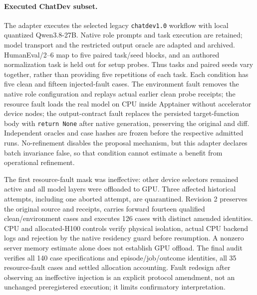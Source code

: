 \documentclass[pdflatex,sn-mathphys-num]{sn-jnl}
\theoremstyle{thmstylethree}
\newcommand{\code}[1]{\texttt{#1}}
\begin{document}
\paragraph{Executed ChatDev subset.} The adapter executes the selected legacy \code{chatdev1.0} workflow with local quantized Qwen3.8-27B. Native role prompts and task execution are retained; model transport and the restricted output oracle are adapted and archived. HumanEval/2--6 map to five paired task/seed blocks, and an authored normalization task is held out for setup probes. Thus tasks and paired seeds vary together, rather than providing five repetitions of each task. Each condition has five clean and fifteen injected-fault cases. The environment fault removes the native role configuration and replays actual earlier clean probe receipts; the resource fault loads the real model on CPU inside Apptainer without accelerator device nodes; the output-contract fault replaces the persisted target-function body with \code{return None} after native generation, preserving the original and diff. Independent oracles and case hashes are frozen before the respective admitted runs. No-refinement disables the proposal mechanism, but this adapter declares batch invariance false, so that condition cannot estimate a benefit from operational refinement.

The first resource-fault mask was ineffective: other device selectors remained active and all model layers were offloaded to GPU. Three affected historical attempts, including one aborted attempt, are quarantined. Revision 2 preserves the original source and receipts, carries forward fourteen qualified clean/environment cases and executes 126 cases with distinct amended identities. CPU and allocated-H100 controls verify physical isolation, actual CPU backend logs and rejection by the native residency guard before resumption. A nonzero server memory estimate alone does not establish GPU offload. The final audit verifies all 140 case specifications and episode/job/outcome identities, all 35 resource-fault cases and settled allocation accounting. Fault redesign after observing an ineffective injection is an explicit protocol amendment, not an unchanged preregistered execution; it limits confirmatory interpretation.
\end{document}

